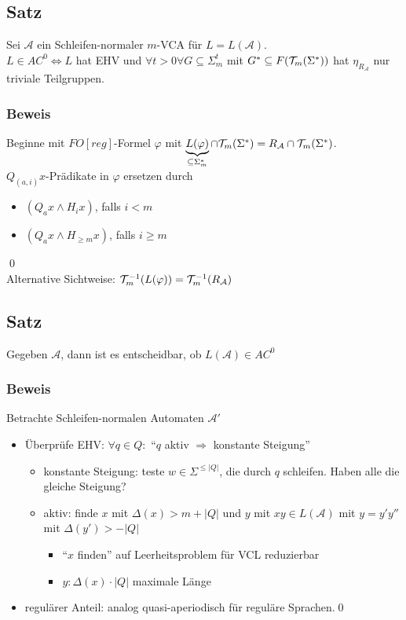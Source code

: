     \subsection{Satz}
        Sei $\mathcal{A}$ ein Schleifen-normaler $m$-VCA für $L=L(\mathcal{A})$.\\
        $L\in AC^0\Leftrightarrow L$ hat EHV und $\forall t>0\forall G\subseteq\Sigma_m^t$ mit $G^*\subseteq F(\mathcal{T}_m(\Sigma^*))$ hat $\eta_{R_\mathcal{A}}$ nur triviale Teilgruppen.
        \subsubsection{Beweis}
            Beginne mit $FO[reg]$-Formel $\varphi$ mit $\underbrace{L(\varphi)}_{\subseteq\Sigma^*_m}\cap\mathcal{T}_m(\Sigma^*)=R_\mathcal{A}\cap\mathcal{T}_m(\Sigma^*)$.\\
            $Q_{(a,i)}x$-Prädikate in $\varphi$ ersetzen durch
            \begin{itemize}
                \item $(Q_ax\wedge H_ix)$, falls $i<m$
                \item $(Q_ax\wedge H_{\geq m}x)$, falls $i\geq m$
            \end{itemize}\qed\\
            Alternative Sichtweise: $\mathcal{T}_m^{-1}(L(\varphi))=\mathcal{T}_m^{-1}(R_\mathcal{A})$\\
    \subsection{Satz}
        Gegeben $\mathcal{A}$, dann ist es entscheidbar, ob $L(\mathcal{A})\in AC^0$
        \subsubsection{Beweis}
            Betrachte Schleifen-normalen Automaten $\mathcal{A}'$
            \begin{itemize}
                \item Überprüfe EHV: $\forall q\in Q:$ ``$q$ aktiv $\Rightarrow$ konstante Steigung''
                \begin{itemize}
                    \item konstante Steigung: teste $w\in\Sigma^{\le|Q|}$, die durch $q$ schleifen. Haben alle die gleiche Steigung?
                    \item aktiv: finde $x$ mit $\Delta(x)>m+|Q|$ und $y$ mit $xy\in L(\mathcal{A})$ mit $y=y'y''$ mit $\Delta(y')>-|Q|$
                    \begin{itemize}
                        \item ``$x$ finden'' auf Leerheitsproblem für VCL reduzierbar
                        \item $y:\Delta(x)\cdot|Q|$ maximale Länge
                    \end{itemize}
                \end{itemize}
                \item regulärer Anteil: analog quasi-aperiodisch für reguläre Sprachen.\qed
            \end{itemize}
